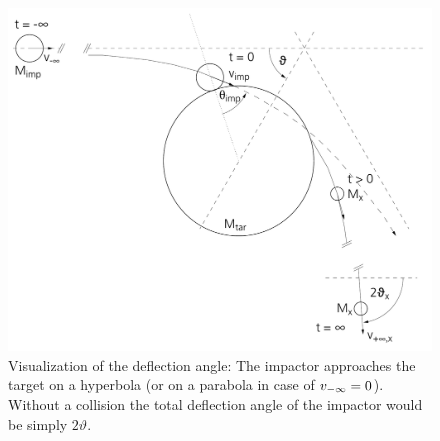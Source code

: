 \begin{figure}
\begin{center}
\includegraphics[scale=0.5]{04_vartheta}
\caption{Visualization of the deflection angle: The impactor approaches the target on a hyperbola (or on a parabola in case of $v_{-\infty} = 0$). Without a collision the total deflection angle of the impactor would be simply $2 \vartheta$.}
\label{ch03_fig02}
\end{center}
\end{figure}


